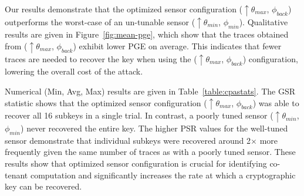 Our results demonstrate that the optimized sensor configuration ($\uparrow\theta_{max}$, $\phi_{back}$) outperforms the worst-case of an un-tunable sensor ($\uparrow\theta_{min}$, $\phi_{min}$). Qualitative results are given in Figure~\ref{fig:mean-pge}, which show that the traces obtained from ($\uparrow\theta_{max}$, $\phi_{back}$) exhibit lower PGE on average. This indicates that fewer traces are needed to recover the key when using the ($\uparrow\theta_{max}$, $\phi_{back}$) configuration, lowering the overall cost of the attack.

Numerical (Min, Avg, Max) results are given in Table~\ref{table:cpastats}. The GSR statistic shows that the optimized sensor configuration ($\uparrow\theta_{max}$, $\phi_{back}$) was able to recover all 16 subkeys in a single trial. In contrast, a poorly tuned sensor ($\uparrow\theta_{min}$, $\phi_{min}$) never recovered the entire key. The higher PSR values for the well-tuned sensor demonstrate that individual subkeys were recovered around 2$\times$ more frequently given the same number of traces as with a poorly tuned sensor. These results show that optimized sensor configuration is crucial for identifying co-tenant computation and significantly increases the rate at which a cryptographic key can be recovered.




